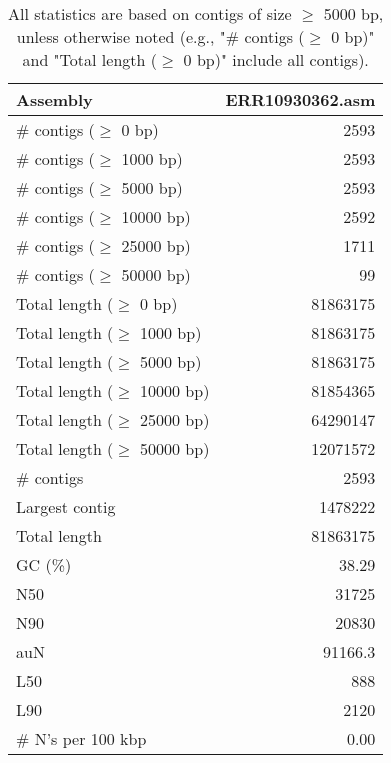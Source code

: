\documentclass[12pt,a4paper]{article}
\begin{document}
\begin{table}[ht]
\begin{center}
\caption{All statistics are based on contigs of size $\geq$ 5000 bp, unless otherwise noted (e.g., "\# contigs ($\geq$ 0 bp)" and "Total length ($\geq$ 0 bp)" include all contigs).}
\begin{tabular}{|l*{1}{|r}|}
\hline
Assembly & ERR10930362.asm \\ \hline
\# contigs ($\geq$ 0 bp) & 2593 \\ \hline
\# contigs ($\geq$ 1000 bp) & 2593 \\ \hline
\# contigs ($\geq$ 5000 bp) & 2593 \\ \hline
\# contigs ($\geq$ 10000 bp) & 2592 \\ \hline
\# contigs ($\geq$ 25000 bp) & 1711 \\ \hline
\# contigs ($\geq$ 50000 bp) & 99 \\ \hline
Total length ($\geq$ 0 bp) & 81863175 \\ \hline
Total length ($\geq$ 1000 bp) & 81863175 \\ \hline
Total length ($\geq$ 5000 bp) & 81863175 \\ \hline
Total length ($\geq$ 10000 bp) & 81854365 \\ \hline
Total length ($\geq$ 25000 bp) & 64290147 \\ \hline
Total length ($\geq$ 50000 bp) & 12071572 \\ \hline
\# contigs & 2593 \\ \hline
Largest contig & 1478222 \\ \hline
Total length & 81863175 \\ \hline
GC (\%) & 38.29 \\ \hline
N50 & 31725 \\ \hline
N90 & 20830 \\ \hline
auN & 91166.3 \\ \hline
L50 & 888 \\ \hline
L90 & 2120 \\ \hline
\# N's per 100 kbp & 0.00 \\ \hline
\end{tabular}
\end{center}
\end{table}
\end{document}
